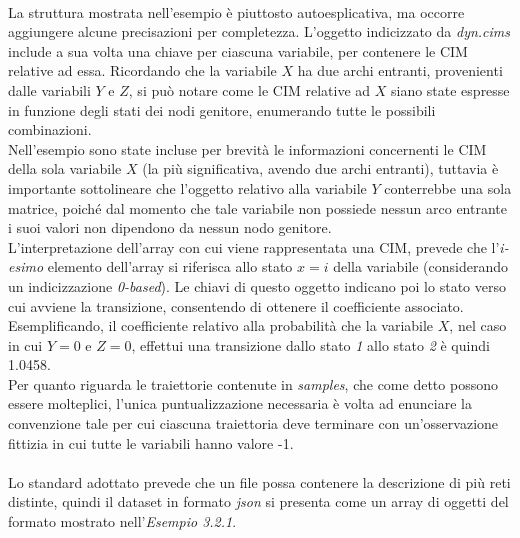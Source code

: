   \paragraph{}
  La struttura mostrata nell'esempio è piuttosto autoesplicativa, ma occorre aggiungere alcune precisazioni
  per completezza. L'oggetto indicizzato da \textit{dyn.cims} include a sua volta una chiave 
  per ciascuna variabile, per contenere le CIM relative ad essa. 
  Ricordando che la variabile $X$ ha due archi entranti, provenienti dalle variabili
  $Y$ e $Z$, si può notare come le CIM relative ad $X$ siano state espresse in funzione
  degli stati dei nodi genitore, enumerando tutte le possibili combinazioni.\\
  Nell'esempio sono state incluse per brevità le informazioni concernenti le CIM della sola
  variabile $X$ (la più significativa, avendo due archi entranti), tuttavia è importante sottolineare che l'oggetto 
  relativo alla variabile $Y$ conterrebbe una sola matrice, poiché dal momento che tale variabile non possiede nessun arco entrante
  i suoi valori non dipendono da nessun nodo genitore.\\
  L'interpretazione dell'array con cui viene rappresentata una CIM, prevede che
  l'\textit{i-esimo} elemento dell'array si riferisca allo stato $x = i$ della variabile (considerando 
  un indicizzazione \textit{0-based}). 
  Le chiavi di questo oggetto indicano poi lo stato verso cui avviene la transizione, 
  consentendo di ottenere il coefficiente associato.\\
  Esemplificando, il coefficiente relativo alla probabilità che la variabile $X$, nel caso in cui $Y=0$ e $Z=0$,
  effettui una transizione dallo stato \textit{1} allo stato \textit{2} è quindi 1.0458.\\
  Per quanto riguarda le traiettorie contenute in \textit{samples}, che come detto 
  possono essere molteplici, l'unica puntualizzazione necessaria è volta ad enunciare la convenzione tale per cui
  ciascuna traiettoria deve terminare con un'osservazione fittizia in cui tutte le variabili hanno valore -1.

  \paragraph{}
  Lo standard adottato prevede che un file possa contenere la descrizione di più reti distinte,
  quindi il dataset in formato \textit{json} si presenta come un array di oggetti del formato mostrato 
  nell'\textit{Esempio 3.2.1}.

